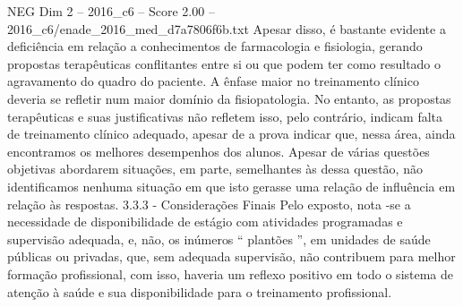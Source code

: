 \begin{textsample}{NEG Dim 2 – 2016\_c6 – Score 2.00 – 2016\_c6/enade\_2016\_med\_d7a7806f6b.txt}
Apesar disso, é bastante evidente a deficiência em relação a conhecimentos de farmacologia e fisiologia, gerando propostas terapêuticas conflitantes entre si ou que podem ter como resultado o agravamento do quadro do paciente.
A ênfase maior no treinamento clínico deveria se refletir num maior domínio da fisiopatologia.
No entanto, as propostas terapêuticas e suas justificativas não refletem isso, pelo contrário, indicam falta de treinamento clínico adequado, apesar de a prova indicar que, nessa área, ainda encontramos os melhores desempenhos dos alunos.
Apesar de várias questões objetivas abordarem situações, em parte, semelhantes às dessa questão, não identificamos nenhuma situação em que isto gerasse uma relação de influência em relação às respostas. 3.3.3 - Considerações Finais Pelo exposto, nota -se a necessidade de disponibilidade de estágio com atividades programadas e supervisão adequada, e, não, os inúmeros “ plantões ”, em unidades de saúde públicas ou privadas, que, sem adequada supervisão, não contribuem para melhor formação profissional, com isso, haveria um reflexo positivo em todo o sistema de atenção à saúde e sua disponibilidade para o treinamento profissional.

\end{textsample}
